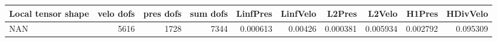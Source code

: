\begin{tabular}{lrrrrrrrrr}
\toprule
Local tensor shape &  velo dofs &  pres dofs &  sum dofs &  LinfPres &  LinfVelo &   L2Pres &   L2Velo &   H1Pres &  HDivVelo \\
\midrule
               NAN &       5616 &       1728 &      7344 &  0.000613 &   0.00426 & 0.000381 & 0.005934 & 0.002792 &  0.095309 \\
\bottomrule
\end{tabular}
